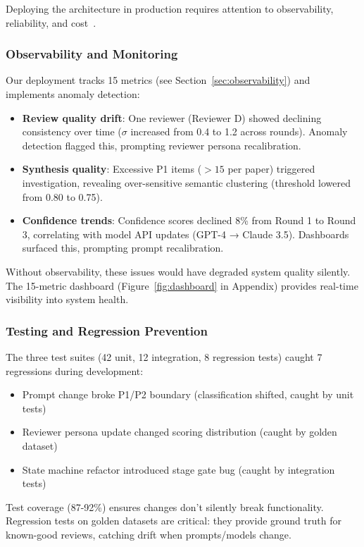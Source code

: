 Deploying the architecture in production requires attention to observability, reliability, and cost~\cite{shankar2022operationalizing}.

\subsubsection{Observability and Monitoring}

Our deployment tracks 15 metrics (see Section~\ref{sec:observability}) and implements anomaly detection:
\begin{itemize}
\item \textbf{Review quality drift}: One reviewer (Reviewer D) showed declining consistency over time ($\sigma$ increased from 0.4 to 1.2 across rounds). Anomaly detection flagged this, prompting reviewer persona recalibration.
\item \textbf{Synthesis quality}: Excessive P1 items ($> 15$ per paper) triggered investigation, revealing over-sensitive semantic clustering (threshold lowered from 0.80 to 0.75).
\item \textbf{Confidence trends}: Confidence scores declined 8\% from Round 1 to Round 3, correlating with model API updates (GPT-4 → Claude 3.5). Dashboards surfaced this, prompting prompt recalibration.
\end{itemize}

Without observability, these issues would have degraded system quality silently. The 15-metric dashboard (Figure~\ref{fig:dashboard} in Appendix) provides real-time visibility into system health.

\subsubsection{Testing and Regression Prevention}

The three test suites (42 unit, 12 integration, 8 regression tests) caught 7 regressions during development:
\begin{itemize}
\item Prompt change broke P1/P2 boundary (classification shifted, caught by unit tests)
\item Reviewer persona update changed scoring distribution (caught by golden dataset)
\item State machine refactor introduced stage gate bug (caught by integration tests)
\end{itemize}

Test coverage (87-92\%) ensures changes don't silently break functionality. Regression tests on golden datasets are critical: they provide ground truth for known-good reviews, catching drift when prompts/models change.

